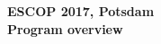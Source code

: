 \documentclass[%
  a5paper,
  pagesize,%
  1headlines,%
  8pt,%
  DIV=14,
  BCOR=12mm,
  twoside,
  smallheadings,
]{scrartcl}
\begin{document}
\thispagestyle{empty}
\begin{center}
\Huge\bf ESCOP 2017, Potsdam\\ Program overview \\
\end{center}



\end{document}
